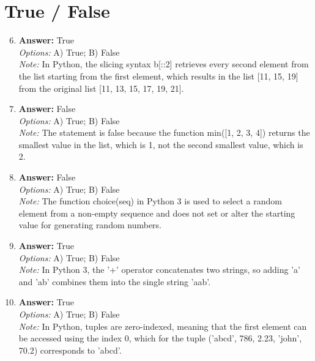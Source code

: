\documentclass[12pt]{article}
\begin{document}
\section*{True / False}
\begin{enumerate}[label=\arabic*.]
\setcounter{enumi}{5}
\item \textbf{Answer:} True
\\ \textit{Options:} A) True; B) False
\\ \textit{Note:} In Python, the slicing syntax b[::2] retrieves every second element from the list starting from the first element, which results in the list [11, 15, 19] from the original list [11, 13, 15, 17, 19, 21].
\item \textbf{Answer:} False
\\ \textit{Options:} A) True; B) False
\\ \textit{Note:} The statement is false because the function min([1, 2, 3, 4]) returns the smallest value in the list, which is 1, not the second smallest value, which is 2.
\item \textbf{Answer:} False
\\ \textit{Options:} A) True; B) False
\\ \textit{Note:} The function choice(seq) in Python 3 is used to select a random element from a non-empty sequence and does not set or alter the starting value for generating random numbers.
\item \textbf{Answer:} True
\\ \textit{Options:} A) True; B) False
\\ \textit{Note:} In Python 3, the '+' operator concatenates two strings, so adding 'a' and 'ab' combines them into the single string 'aab'.
\item \textbf{Answer:} True
\\ \textit{Options:} A) True; B) False
\\ \textit{Note:} In Python, tuples are zero-indexed, meaning that the first element can be accessed using the index 0, which for the tuple ('abcd', 786, 2.23, 'john', 70.2) corresponds to 'abcd'.
\end{enumerate}
\end{document}
